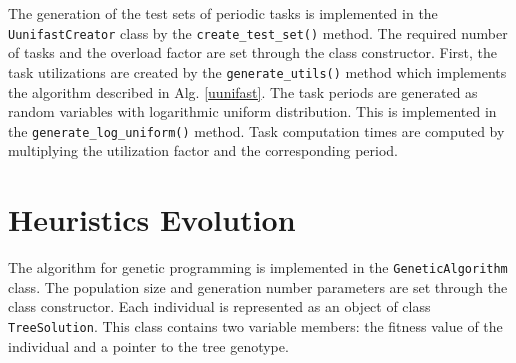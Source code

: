 The generation of the test sets of periodic tasks is implemented in the 
\\\texttt{UunifastCreator} class by the \texttt{create\_test\_set()} method.
The required number of tasks and the overload factor are set through the class constructor.
First, the task utilizations are created by the \texttt{generate\_utils()} method which implements the algorithm described in Alg. \ref{uunifast}.
The task periods are generated as random variables with logarithmic uniform distribution.
This is implemented in the \texttt{generate\_log\_uniform()} method.
Task computation times are computed by multiplying the utilization factor and the corresponding period.

\section{Heuristics Evolution}
The algorithm for genetic programming is implemented in the \texttt{GeneticAlgorithm} class.
The population size and generation number parameters are set through the class constructor.
Each individual is represented as an object of class \texttt{TreeSolution}.
This class contains two variable members: the fitness value of the individual and a pointer to the tree genotype.

